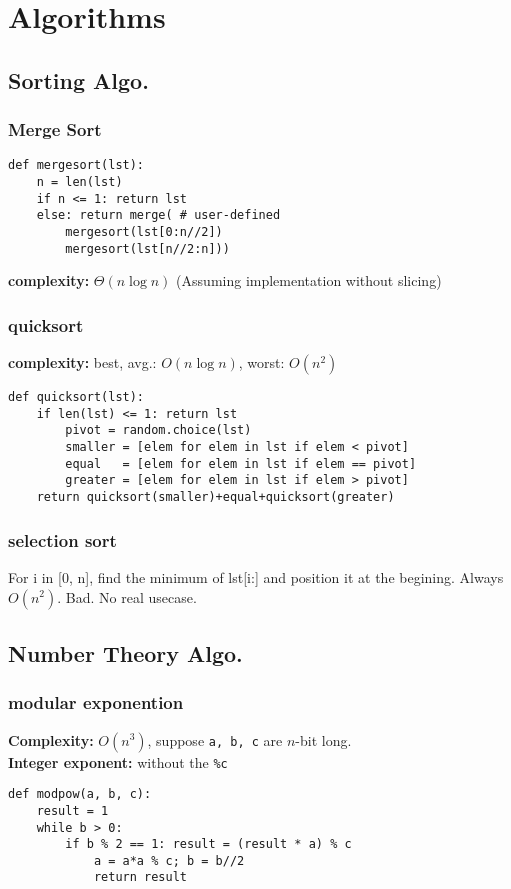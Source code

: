 \documentclass[]{article}
\newcommand\fortitle[1] {\Large #1 \normalsize}
\begin{document}
	\section{\fortitle{Algorithms}}
	\begin{multicols}{2}
		
		\subsection{Sorting Algo.}
		\subsubsection{Merge Sort}
		\begin{lstlisting}
def mergesort(lst): 
	n = len(lst)
	if n <= 1: return lst
	else: return merge( # user-defined
		mergesort(lst[0:n//2])
		mergesort(lst[n//2:n]))\end{lstlisting}
		\textbf{complexity: }$ \Theta(n \log n) $ (Assuming implementation without slicing)
		\subsubsection{quicksort}
		\textbf{complexity: }best, avg.: $ O(n \log n) $, worst: $ O(n^2) $
		\begin{lstlisting}
def quicksort(lst): 
	if len(lst) <= 1: return lst
		pivot = random.choice(lst)
		smaller = [elem for elem in lst if elem < pivot]
		equal   = [elem for elem in lst if elem == pivot]
		greater = [elem for elem in lst if elem > pivot]
	return quicksort(smaller)+equal+quicksort(greater)\end{lstlisting}
		\subsubsection{selection sort}
		For i in [0, n], find the minimum of lst[i:] and position it at the begining. Always $ O(n^2) $. Bad. No real usecase. 
		
		\subsection{Number Theory Algo. }
		\subsubsection{modular exponention}
		\textbf{Complexity: }$ O(n^3) $, suppose \texttt{a, b, c} are $ n $-bit long. \\
		\textbf{Integer exponent: }without the \texttt{\%c}
		\begin{lstlisting}
def modpow(a, b, c): 
	result = 1
	while b > 0: 
		if b % 2 == 1: result = (result * a) % c
			a = a*a % c; b = b//2
			return result\end{lstlisting}

\end{multicols}
\end{document}
